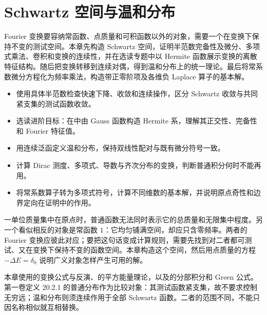 \chapter{Schwartz 空间与温和分布}
\label{b2:ch:05}
\begin{chapterabstract}
Fourier 变换要容纳常函数、点质量和可积函数以外的对象，需要一个在变换下保持不变的测试空间。本章先构造 Schwartz 空间，证明半范数完备性及微分、多项式乘法、卷积和变换的连续性，并在选读专题中以 Hermite 函数展示变换的离散特征结构。随后把变换转移到连续对偶，得到温和分布上的统一理论。最后将常系数微分方程化为频率乘法，构造带正零阶项及各维负 Laplace 算子的基本解。
\end{chapterabstract}
\begin{learninggoals}
\begin{itemize}
\item\label{b2:item:05-goal-schwartz}使用具体半范数检查快速下降、收敛和连续操作，区分 Schwartz 收敛与共同紧支集的测试函数收敛。
\item\label{b2:item:05-goal-hermite}选读进阶目标：在中由 Gauss 函数构造 Hermite 系，理解其正交性、完备性和 Fourier 特征值。
\item\label{b2:item:05-goal-tempered}用连续泛函定义温和分布，保持双线性配对与既有微分符号一致。
\item\label{b2:item:05-goal-examples}计算 Dirac 测度、多项式、导数与齐次分布的变换，判断普通积分何时不能再用。
\item\label{b2:item:05-goal-fundamental}将常系数算子转为多项式符号，计算不同维数的基本解，并说明原点奇性和边界定向在证明中的作用。
\end{itemize}
\end{learninggoals}

一单位质量集中在原点时，普通函数无法同时表示它的总质量和无限集中程度。另一个看似相反的对象是常函数 \(1\)：它均匀铺满空间，却应只含零频率。两者的 Fourier 变换应彼此对应；要把这句话变成计算规则，需要先找到对二者都可测试、又在变换下保持不变的函数空间。本章构造这个空间，然后用点质量的方程 \(-\Delta E=\delta_0\) 说明广义对象怎样产生可用的解。

\ProseParagraphBreak

本章使用的变换公式与反演、的平方能量理论，以及的分部积分和 Green 公式。第一卷定义 20.2.1 的普通分布作为比较对象：其测试函数紧支集，故不要求控制无穷远；温和分布则须连续作用于全部 Schwartz 函数。二者的范围不同，不能只因名称相似就互相替换。

